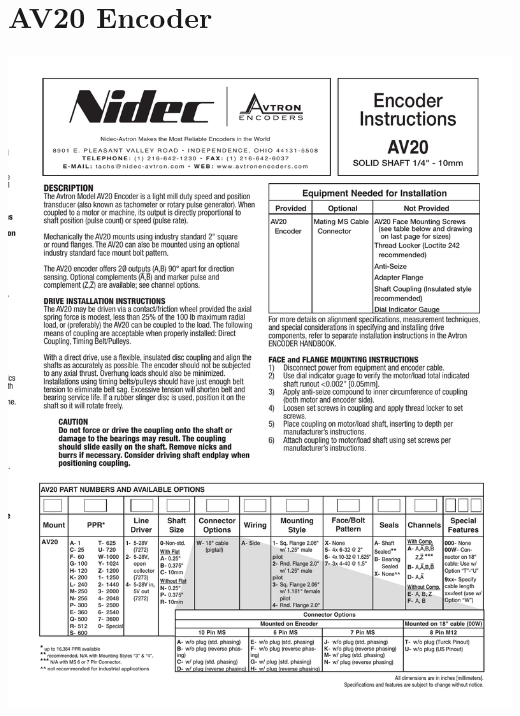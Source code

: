 \section{AV20 Encoder}
\begin{center}
	\includegraphics[width=6.5in,angle=0]{afiles/FX1.pdf}
\end{center}
